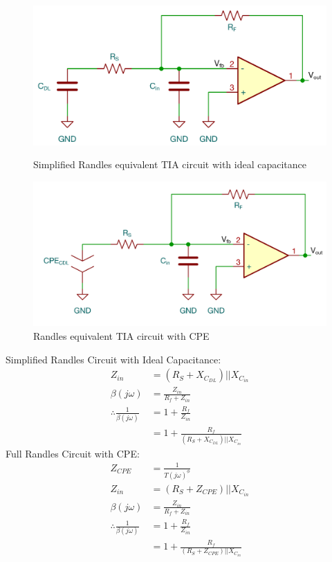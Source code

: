 \begin{figure}[H]
    \centering
    \begin{minipage}{0.5\textwidth}
        \centering
        \includegraphics[width=\textwidth]{RandlesSimpleTIA.png}
        \caption{Simplified Randles equivalent TIA circuit with ideal capacitance}
        \label{fig:randles_cdl_tia}
    \end{minipage}\hfill
    \begin{minipage}{0.5\textwidth}
        \centering
        \includegraphics[width=\textwidth]{RandlesTIA.png}
        \caption{Randles equivalent TIA circuit with CPE}
        \label{fig:randles_cpe_tia}
    \end{minipage}
\end{figure}

Simplified Randles Circuit with Ideal Capacitance:
\begin{align}
    Z_{in} &= (R_S + X_{C_{DL}}) || X_{C_{in}} \label{eq:simple_zin}\\
    \beta (j\omega) &= \frac{Z_{in}}{R_f + Z_{in}} \label{eq:simple_beta} \\
    \therefore \frac{1}{\beta(j\omega)} &= 1 + \frac{R_f}{Z_{in}} \nonumber\\
    &= 1 + \frac{R_f}{(R_S + X_{C_{DL}}) || X_{C_{in}}}
\end{align}
Full Randles Circuit with CPE:
\begin{align}
    Z_{CPE} &= \frac{1}{T(j\omega)^{\phi}} \\
    Z_{in} &= (R_S + Z_{CPE}) || X_{C_{in}} \\
    \beta (j\omega) &= \frac{Z_{in}}{R_f + Z_{in}} \label{eq:randles_beta}\\
    \therefore \frac{1}{\beta(j\omega)} &= 1 + \frac{R_f}{Z_{in}} \nonumber\\
    &= 1 + \frac{R_f}{(R_S + Z_{CPE}) || X_{C_{in}}}
\end{align}

